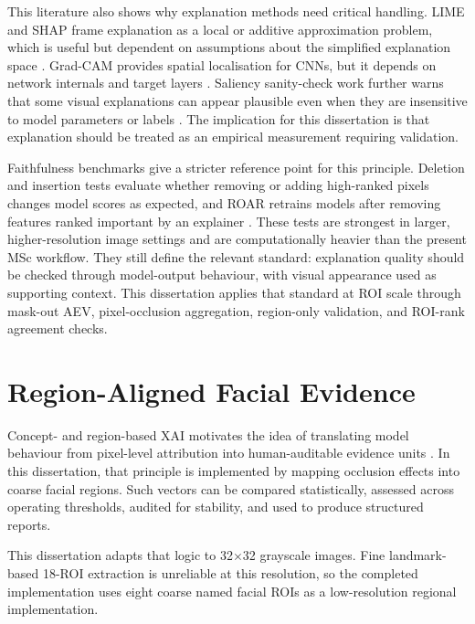 This literature also shows why explanation methods need critical handling. LIME and SHAP frame explanation as a local or additive approximation problem, which is useful but dependent on assumptions about the simplified explanation space  . Grad-CAM provides spatial localisation for CNNs, but it depends on network internals and target layers . Saliency sanity-check work further warns that some visual explanations can appear plausible even when they are insensitive to model parameters or labels . The implication for this dissertation is that explanation should be treated as an empirical measurement requiring validation.


Faithfulness benchmarks give a stricter reference point for this principle. Deletion and insertion tests evaluate whether removing or adding high-ranked pixels changes model scores as expected, and ROAR retrains models after removing features ranked important by an explainer  . These tests are strongest in larger, higher-resolution image settings and are computationally heavier than the present MSc workflow. They still define the relevant standard: explanation quality should be checked through model-output behaviour, with visual appearance used as supporting context. This dissertation applies that standard at ROI scale through mask-out AEV, pixel-occlusion aggregation, region-only validation, and ROI-rank agreement checks.


\section{Region-Aligned Facial Evidence}

Concept- and region-based XAI motivates the idea of translating model behaviour from pixel-level attribution into human-auditable evidence units   . In this dissertation, that principle is implemented by mapping occlusion effects into coarse facial regions. Such vectors can be compared statistically, assessed across operating thresholds, audited for stability, and used to produce structured reports.


This dissertation adapts that logic to 32$\times$32 grayscale images. Fine landmark-based 18-ROI extraction is unreliable at this resolution, so the completed implementation uses eight coarse named facial ROIs as a low-resolution regional implementation.


